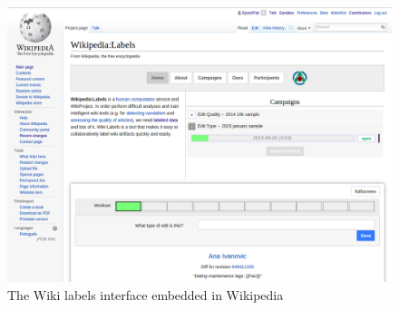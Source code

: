 \begin{figure}[h]
  \centering
  \includegraphics[width=.50\textwidth]{figures/Wiki_labels_gadget}
  \caption{The Wiki labels interface embedded in Wikipedia}
  \label{fig:wikilabels_screenshot}
\end{figure}

